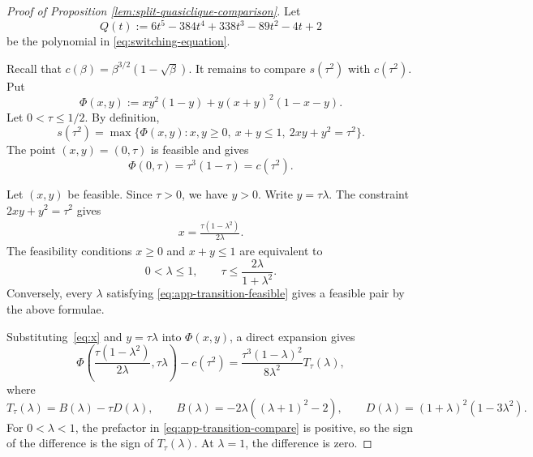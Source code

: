 \documentclass[10pt,a4paper]{amsart}
\begin{document}
\begin{proof}[Proof of Proposition \ref{lem:split-quasiclique-comparison}]

 Let
 \[
 Q(t):=6t^5-384t^4+338t^3-89t^2-4t+2
 \]
 be the polynomial in \eqref{eq:switching-equation}. %


Recall that $c(\beta)=\beta^{3/2}(1-\sqrt{\beta})$. It remains to compare \(s(\tau^2)\) with \(c(\tau^2)\). Put
\[
\Phi(x,y):=xy^2(1-y)+y(x+y)^2(1-x-y).
\]
Let \(0<\tau\le 1/2\). By definition,
\[
s(\tau^2)
=
\max\{\Phi(x,y): x,y\ge0,\ x+y\le1,\ 2xy+y^2=\tau^2\}.
\]
The point \((x,y)=(0,\tau)\) is feasible and gives
\[
\Phi(0,\tau)=\tau^3(1-\tau)=c(\tau^2).
\]


Let \((x,y)\) be feasible. Since \(\tau>0\), we have \(y>0\). Write
$y=\tau\lambda $. The constraint \(2xy+y^2=\tau^2\) gives
\begin{align}\label{eq:x}
x=\frac{\tau(1-\lambda^2)}{2\lambda}.
\end{align}
The feasibility conditions \(x\ge0\) and \(x+y\le1\) are equivalent to
\begin{equation}\label{eq:app-transition-feasible}
0<\lambda\le1,
\qquad
\tau\le \frac{2\lambda}{1+\lambda^2}.
\end{equation}
Conversely, every \(\lambda\) satisfying
\eqref{eq:app-transition-feasible} gives a feasible pair by the above
formulae.


Substituting~\eqref{eq:x} and $y=\tau\lambda$
into \(\Phi(x,y)\), a direct expansion gives
\begin{equation}\label{eq:app-transition-compare}
\Phi\left(\frac{\tau(1-\lambda^2)}{2\lambda},\tau\lambda\right)
-
c(\tau^2)
=
\frac{\tau^3(1-\lambda)^2}{8\lambda^2}T_\tau(\lambda),
\end{equation}
where
\[
T_\tau(\lambda)=B(\lambda)-\tau D(\lambda),
\qquad
B(\lambda)=-2\lambda((\lambda+1)^2-2),
\qquad
D(\lambda)=(1+\lambda)^2(1-3\lambda^2).
\]
For \(0<\lambda<1\), the prefactor in
\eqref{eq:app-transition-compare} is positive, so the sign of the difference
is the sign of \(T_\tau(\lambda)\). At \(\lambda=1\), the difference is zero.



\end{proof}
\end{document}
